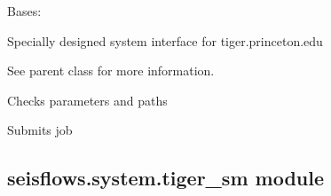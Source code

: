 \documentclass[letterpaper,10pt,english]{sphinxmanual}
\begin{document}
\begin{fulllineitems}
\label{\detokenize{ref/seisflows.system:seisflows.system.tiger_lg.tiger_lg}}
Bases: {\hyperref[\detokenize{ref/seisflows.system:seisflows.system.slurm_lg.slurm_lg}]{}}

Specially designed system interface for tiger.princeton.edu

See parent class for more information.

\begin{fulllineitems}
\label{\detokenize{ref/seisflows.system:seisflows.system.tiger_lg.tiger_lg.check}}
Checks parameters and paths

\end{fulllineitems}


\begin{fulllineitems}
\label{\detokenize{ref/seisflows.system:seisflows.system.tiger_lg.tiger_lg.submit}}
Submits job

\end{fulllineitems}


\end{fulllineitems}



\subsection{seisflows.system.tiger\_sm module}
\label{\detokenize{ref/seisflows.system:module-seisflows.system.tiger_sm}}\label{\detokenize{ref/seisflows.system:seisflows-system-tiger-sm-module}}
\end{document}
